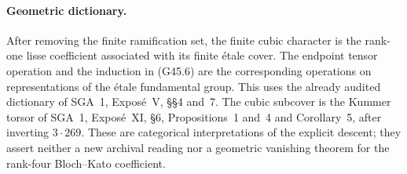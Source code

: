 \paragraph{Geometric dictionary.}
After removing the finite ramification set, the finite cubic
character is the rank-one lisse coefficient associated with
its finite \'etale cover.  The endpoint tensor operation and
the induction in (G45.6) are the corresponding operations on
representations of the \'etale fundamental group.  This uses
the already audited dictionary of SGA~1, Expos\'e~V,
\S\S4 and~7.  The cubic subcover is the Kummer torsor of
SGA~1, Expos\'e~XI, \S6, Propositions~1 and~4 and
Corollary~5, after inverting $3\cdot269$.
These are categorical interpretations of the explicit descent;
they assert neither a new archival reading nor a geometric
vanishing theorem for the rank-four Bloch--Kato coefficient.

